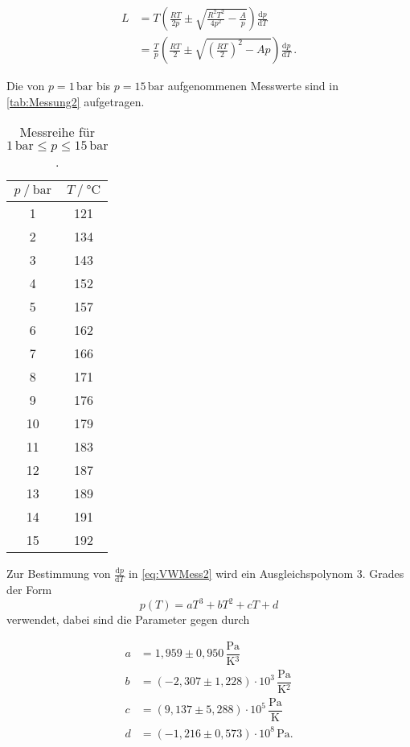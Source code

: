 \begin{align}
  \nonumber
  L &= T \left(\frac{RT}{2p} \pm \sqrt{\frac{R^2 T^2}{4 p^2} - \frac{A}{p}} \right) 
  \frac{\mathrm{d}p}{\mathrm{d}T} \\
    &= \frac{T}{p} \left(\frac{RT}{2} \pm \sqrt{\left(\frac{R T}{2} \right)^2 - A p}\right) 
    \frac{\mathrm{d}p}{\mathrm{d}T} \,. 
    \label{eq:VWMess2}
\end{align}

\newpage

Die von $p = 1 \,\unit{\bar}$ bis $p = 15 \,\unit{\bar}$ aufgenommenen Messwerte sind in 
\autoref{tab:Messung2} aufgetragen.

\begin{table}[H]
  \centering
  \caption{Messreihe für  $1 \,\unit{\bar} \leq p \leq 15 \,\unit{\bar} $.}
  \label{tab:Messung2}
  \begin{tabular}{S S}
    \toprule
    {$p \mathbin{/} \unit{\bar}$} & {$T \mathbin{/} \unit{\celsius}$} \\
     & 121 \\
     2 & 134 \\
     3 & 143 \\
     4 & 152 \\
     5 & 157 \\
     6 & 162 \\
     7 & 166 \\
     8 & 171 \\
     9 & 176 \\
    10 & 179 \\
    11 & 183 \\
    12 & 187 \\
    13 & 189 \\
    14 & 191 \\
    15 & 192 \\
    \bottomrule
  \end{tabular}
\end{table}

Zur Bestimmung von $\frac{\mathrm{d}p}{\mathrm{d}T}$ in \eqref{eq:VWMess2} wird ein Ausgleichspolynom
3. Grades der Form
\begin{equation*}
  p(T) = a T^3 + b T^2 + c T + d
\end{equation*} verwendet, dabei sind die Parameter gegen durch

\begin{align*}
  a & =   1,959   \pm 0,950                  \,\dfrac{\unit{\pascal}}{\unit{\kelvin^3}}  \\
  b & = (-2,307   \pm 1,228)  \cdot 10^3     \,\dfrac{\unit{\pascal}}{\unit{\kelvin^2}}  \\
  c & =  (9,137   \pm 5,288)  \cdot 10^5     \,\dfrac{\unit{\pascal}}{\unit{\kelvin}}    \\
  d & = (-1,216   \pm 0,573)  \cdot 10^8     \,\unit{\pascal}.
\end{align*}



